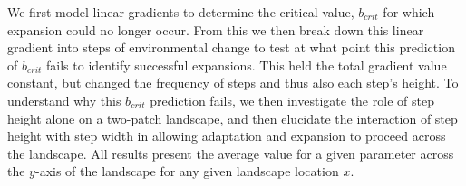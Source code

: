 We first model linear gradients to determine the critical value, $b_{crit}$ for which expansion could no longer occur. From this we then break down this linear gradient into steps of environmental change to test at what point this prediction of $b_{crit}$ fails to identify successful expansions. This held the total gradient value constant, but changed the frequency of steps and thus also each step's height. To understand why this $b_{crit}$ prediction fails, we then investigate the role of step height alone on a two-patch landscape, and then elucidate the interaction of step height with step width in allowing adaptation and expansion to proceed across the landscape. All results present  the average value for a given parameter across the $y$-axis of the landscape for any given landscape location $x$. 



